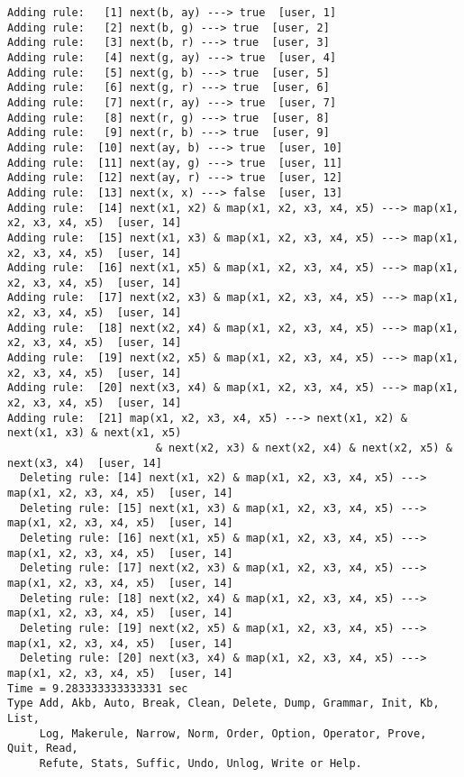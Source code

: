 \begin{verbatim}
Adding rule:   [1] next(b, ay) ---> true  [user, 1]
Adding rule:   [2] next(b, g) ---> true  [user, 2]
Adding rule:   [3] next(b, r) ---> true  [user, 3]
Adding rule:   [4] next(g, ay) ---> true  [user, 4]
Adding rule:   [5] next(g, b) ---> true  [user, 5]
Adding rule:   [6] next(g, r) ---> true  [user, 6]
Adding rule:   [7] next(r, ay) ---> true  [user, 7]
Adding rule:   [8] next(r, g) ---> true  [user, 8]
Adding rule:   [9] next(r, b) ---> true  [user, 9]
Adding rule:  [10] next(ay, b) ---> true  [user, 10]
Adding rule:  [11] next(ay, g) ---> true  [user, 11]
Adding rule:  [12] next(ay, r) ---> true  [user, 12]
Adding rule:  [13] next(x, x) ---> false  [user, 13]
Adding rule:  [14] next(x1, x2) & map(x1, x2, x3, x4, x5) ---> map(x1, x2, x3, x4, x5)  [user, 14]
Adding rule:  [15] next(x1, x3) & map(x1, x2, x3, x4, x5) ---> map(x1, x2, x3, x4, x5)  [user, 14]
Adding rule:  [16] next(x1, x5) & map(x1, x2, x3, x4, x5) ---> map(x1, x2, x3, x4, x5)  [user, 14]
Adding rule:  [17] next(x2, x3) & map(x1, x2, x3, x4, x5) ---> map(x1, x2, x3, x4, x5)  [user, 14]
Adding rule:  [18] next(x2, x4) & map(x1, x2, x3, x4, x5) ---> map(x1, x2, x3, x4, x5)  [user, 14]
Adding rule:  [19] next(x2, x5) & map(x1, x2, x3, x4, x5) ---> map(x1, x2, x3, x4, x5)  [user, 14]
Adding rule:  [20] next(x3, x4) & map(x1, x2, x3, x4, x5) ---> map(x1, x2, x3, x4, x5)  [user, 14]
Adding rule:  [21] map(x1, x2, x3, x4, x5) ---> next(x1, x2) & next(x1, x3) & next(x1, x5) 
                       & next(x2, x3) & next(x2, x4) & next(x2, x5) & next(x3, x4)  [user, 14]
  Deleting rule: [14] next(x1, x2) & map(x1, x2, x3, x4, x5) ---> map(x1, x2, x3, x4, x5)  [user, 14]
  Deleting rule: [15] next(x1, x3) & map(x1, x2, x3, x4, x5) ---> map(x1, x2, x3, x4, x5)  [user, 14]
  Deleting rule: [16] next(x1, x5) & map(x1, x2, x3, x4, x5) ---> map(x1, x2, x3, x4, x5)  [user, 14]
  Deleting rule: [17] next(x2, x3) & map(x1, x2, x3, x4, x5) ---> map(x1, x2, x3, x4, x5)  [user, 14]
  Deleting rule: [18] next(x2, x4) & map(x1, x2, x3, x4, x5) ---> map(x1, x2, x3, x4, x5)  [user, 14]
  Deleting rule: [19] next(x2, x5) & map(x1, x2, x3, x4, x5) ---> map(x1, x2, x3, x4, x5)  [user, 14]
  Deleting rule: [20] next(x3, x4) & map(x1, x2, x3, x4, x5) ---> map(x1, x2, x3, x4, x5)  [user, 14]
Time = 9.283333333333331 sec
Type Add, Akb, Auto, Break, Clean, Delete, Dump, Grammar, Init, Kb, List,
     Log, Makerule, Narrow, Norm, Order, Option, Operator, Prove, Quit, Read,
     Refute, Stats, Suffic, Undo, Unlog, Write or Help.
\end{verbatim}
